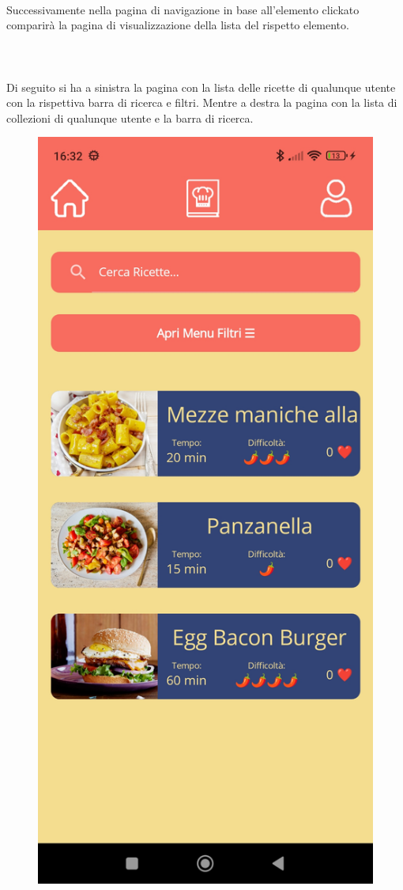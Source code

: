 ﻿\documentclass[a4paper,12pt]{report}
\begin{document}
\\Successivamente nella pagina di navigazione in base all'elemento clickato comparirà la pagina di visualizzazione della lista del rispetto elemento.
\\\\\\\\Di seguito si ha a sinistra la pagina con la lista delle ricette di qualunque utente con la rispettiva barra di ricerca e filtri.
Mentre a destra la pagina con la lista di collezioni di qualunque utente e la barra di ricerca.
\begin{figure}[h!]
    \begin{minipage}{.5\textwidth}
        \centering
        \includegraphics[width=0.9\linewidth]{app_images/RecipeList.jpg}

\end{minipage}
\end{figure}
\end{document}

